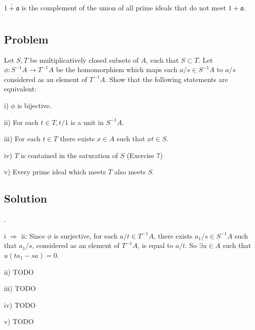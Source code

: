 \documentclass[book,12pt,oneside,openany]{memoir}
\begin{document}
$\bar{1 + \mathfrak{a}}$ is the complement of the union of all prime ideals that do not meet $1 + \mathfrak{a}$.

\section{}
\subsection{Problem}
Let $S,T$ be multiplicatively closed subsets of $A$, such that $S \subset T$. Let $\phi: S^{-1}A \rightarrow T^{-1}A$ be the homomorphism which maps each $a/s \in S^{-1}A$ to $a/s$ considered as an element of $T^{-1}A$. Show that the following statements are equivalent:

i) $\phi$ is bijective.

ii) For each $t \in T, t/1$ is a unit in $S^{-1}A$.

iii) For each $t \in T$ there exists $x \in A$ such that $xt \in S$.

iv) $T$ is contained in the saturation of $S$ (Exercise 7)

v) Every prime ideal which meets $T$ also meets $S$.

\subsection{Solution}
.

i $\Rightarrow$ ii: Since $\phi$ is surjective, for each $a/t \in T^{-1}A$, there exists $a_1/s \in S^{-1}A$ such that $a_1/s$, considered as an element of $T^{-1}A$, is equal to $a/t$. So $\exists u \in A$ such that $u(ta_1 - sa) = 0$.

ii) TODO

iii) TODO

iv) TODO

v) TODO
\end{document}

